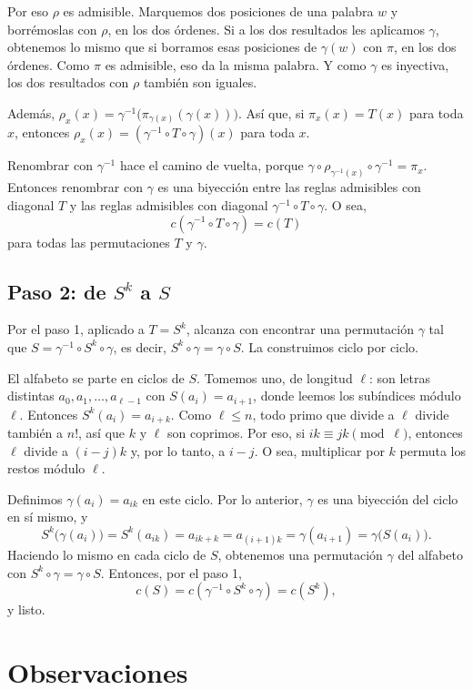 \documentclass[11pt]{amsproc}
\begin{document}
Por eso $\rho$ es admisible. Marquemos dos posiciones de una palabra $w$ y
borrémoslas con $\rho$, en los dos órdenes. Si a los dos resultados les
aplicamos $\gamma$, obtenemos lo mismo que si borramos esas posiciones de
$\gamma(w)$ con $\pi$, en los dos órdenes. Como $\pi$ es admisible, eso da
la misma palabra. Y como $\gamma$ es inyectiva, los dos resultados con
$\rho$ también son iguales.

Además, $\rho_x(x)=\gamma^{-1}\bigl(\pi_{\gamma(x)}(\gamma(x))\bigr)$. Así
que, si $\pi_x(x)=T(x)$ para toda $x$, entonces
$\rho_x(x)=(\gamma^{-1}\circ T\circ\gamma)(x)$ para toda $x$.

Renombrar con $\gamma^{-1}$ hace el camino de vuelta, porque
$\gamma\circ\rho_{\gamma^{-1}(x)}\circ\gamma^{-1}=\pi_x$. Entonces renombrar
con $\gamma$ es una biyección entre las reglas admisibles con diagonal $T$ y
las reglas admisibles con diagonal $\gamma^{-1}\circ T\circ\gamma$. O sea,
\[
  c(\gamma^{-1}\circ T\circ\gamma)=c(T)
\]
para todas las permutaciones $T$ y $\gamma$.

\subsection*{Paso 2: de $S^k$ a $S$}

Por el paso 1, aplicado a $T=S^k$, alcanza con encontrar una permutación
$\gamma$ tal que $S=\gamma^{-1}\circ S^k\circ\gamma$, es decir,
$S^k\circ\gamma=\gamma\circ S$. La construimos ciclo por ciclo.

El alfabeto se parte en ciclos de $S$. Tomemos uno, de longitud $\ell$: son
letras distintas $a_0,a_1,\dots,a_{\ell-1}$ con $S(a_i)=a_{i+1}$, donde
leemos los subíndices módulo $\ell$. Entonces $S^k(a_i)=a_{i+k}$. Como
$\ell\le n$, todo primo que divide a $\ell$ divide también a $n!$, así que
$k$ y $\ell$ son coprimos. Por eso, si $ik\equiv jk\pmod\ell$, entonces
$\ell$ divide a $(i-j)k$ y, por lo tanto, a $i-j$. O sea, multiplicar por
$k$ permuta los restos módulo $\ell$.

Definimos $\gamma(a_i)=a_{ik}$ en este ciclo. Por lo anterior, $\gamma$ es
una biyección del ciclo en sí mismo, y
\[
  S^k\bigl(\gamma(a_i)\bigr)=S^k(a_{ik})=a_{ik+k}=a_{(i+1)k}
  =\gamma(a_{i+1})=\gamma\bigl(S(a_i)\bigr).
\]
Haciendo lo mismo en cada ciclo de $S$, obtenemos una permutación $\gamma$
del alfabeto con $S^k\circ\gamma=\gamma\circ S$. Entonces, por el paso 1,
\[
  c(S)=c(\gamma^{-1}\circ S^k\circ\gamma)=c(S^k),
\]
y listo.

\section*{Observaciones}
\end{document}
